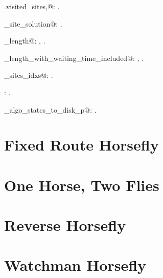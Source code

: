 \documentclass[11.5pt]{report}
\begin{document}
{\begin{list}{}{\setlength{\itemsep}{-\parsep}\setlength{\itemindent}{-\leftmargin}}
\item \verb@self.visited_sites,@: \underline{}.
\item \verb@single_site_solution@: \underline{}.
\item \verb@tour_length@: , \underline{}.
\item \verb@tour_length_with_waiting_time_included@: , \underline{}.
\item \verb@unmarked_sites_idxs@: \underline{}.
\item \verb@wrapperkeyPressHandler@: \underline{}.
\item \verb@write_algo_states_to_disk_p@: \underline{}.
\end{list}} 


\label{chap:segment-horsefly}\chapter{Fixed Route Horsefly}
\label{chap:fixed-route-horsefly}\chapter{One Horse, Two Flies}
\label{chap:one-horse-two-flies}
\chapter{Reverse Horsefly}
\label{chap:reverse-horsefly}\chapter{Watchman Horsefly}
\label{watchman-horsefly}
\end{document}
